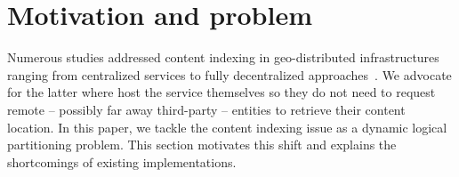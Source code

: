 \section{Motivation and problem}
\label{sec:background}

Numerous studies addressed content indexing in geo-distributed
infrastructures ranging from centralized services to fully
decentralized approaches~\cite{squirrel}. We advocate for the latter where
\processes host the service themselves so they do not need to request
remote -- possibly far away third-party -- entities to retrieve their
content location.  In this paper, we tackle the content indexing issue
as a dynamic logical partitioning problem. This section motivates this
shift and explains the shortcomings of existing implementations.


